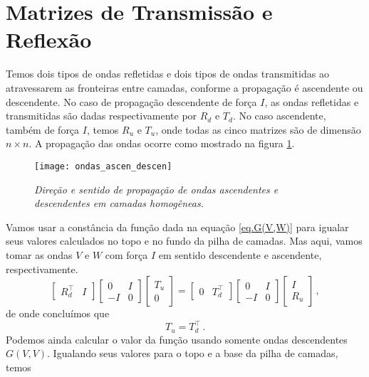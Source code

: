\section{Matrizes de Transmiss\~ao e Reflex\~ao}
Temos dois tipos de ondas refletidas e dois tipos de ondas transmitidas ao atravessarem as fronteiras entre camadas, conforme a propaga\c{c}\~ao \'e ascendente ou descendente. No caso de propaga\c{c}\~ao descendente de for\c{c}a $I$, as ondas refletidas e transmitidas s\~ao dadas respectivamente por $R_d$ e $T_d$. No caso ascendente, tamb\'em de for\c{c}a $I$, temos $R_u$ e $T_u$, onde todas as cinco matrizes s\~ao de dimens\~ao $n\times n$. A propaga\c{c}\~ao das ondas ocorre como mostrado na figura \ref{fig.ondas_ascen_descen}.
\begin{figure}
\centering
\texttt{[image: ondas\_ascen\_descen]}
\caption{\textit{Dire\c{c}\~ao e sentido de propaga\c{c}\~ao de ondas ascendentes e descendentes em camadas homog\^eneas.}}
\label{fig.ondas_ascen_descen}
\end{figure}
Vamos usar a const\^ancia da fun\c{c}\~ao dada na equa\c{c}\~ao \ref{eq.G(V,W)} para igualar seus valores calculados no topo e no fundo da pilha de camadas. Mas aqui, vamos tomar as ondas $V$ e $W$ com for\c{c}a $I$ em sentido descendente e ascendente, respectivamente.  
\begin{equation*}
\begin{bmatrix}
R_d^\top&I
\end{bmatrix}
\begin{bmatrix}
0&I\\
-I&0
\end{bmatrix}
\begin{bmatrix}
T_u\\
0
\end{bmatrix}
=
\begin{bmatrix}
0&T_d^\top
\end{bmatrix}
\begin{bmatrix}
0&I\\
-I&0
\end{bmatrix}
\begin{bmatrix}
I\\
R_u
\end{bmatrix}\,,
\end{equation*}
de onde conclu\'imos que
\begin{equation}\label{eq.T}
T_u=T_d^\top\,.
\end{equation}
Podemos ainda calcular o valor da fun\c{c}\~ao usando somente ondas descendentes $G(V,V)$. Igualando seus valores para o topo e a base da pilha de camadas, temos

